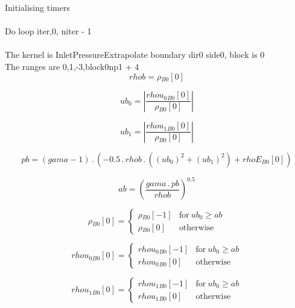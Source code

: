 \documentclass{article}
\begin{document}
\noindent Initialising timers\\
\\\noindent Do loop iter,0, niter - 1\\
\\\noindent The kernel is InletPressureExtrapolate boundary dir0 side0, block is 0\\\noindent The ranges are 0,1,-3,block0np1 + 4\\\begin{dmath}rhob = {\rho{_{B0}}}[{0}]\end{dmath}

\begin{dmath}ub_{0} = \left|{\frac{{rhou_{0}{_{B0}}}[{0}]}{{\rho{_{B0}}}[{0}]}}\right|\end{dmath}

\begin{dmath}ub_{1} = \left|{\frac{{rhou_{1}{_{B0}}}[{0}]}{{\rho{_{B0}}}[{0}]}}\right|\end{dmath}

\begin{dmath}pb = \left(gama - 1\right) \,.\, \left(- 0.5 \,.\, rhob \,.\, \left(\left(ub_{0} \right)^{2} + \left(ub_{1} \right)^{2}\right) + {rhoE{_{B0}}}[{0}]\right)\end{dmath}

\begin{dmath}ab = \left(\frac{gama \,.\, pb}{rhob} \right)^{0.5}\end{dmath}

\begin{dmath}{\rho{_{B0}}}[{0}] = \begin{cases} {\rho{_{B0}}}[{-1}] & \text{for}\: ub_{0} \geq ab \\{\rho{_{B0}}}[{0}] & \text{otherwise} \end{cases}\end{dmath}

\begin{dmath}{rhou_{0}{_{B0}}}[{0}] = \begin{cases} {rhou_{0}{_{B0}}}[{-1}] & \text{for}\: ub_{0} \geq ab \\{rhou_{0}{_{B0}}}[{0}] & \text{otherwise} \end{cases}\end{dmath}

\begin{dmath}{rhou_{1}{_{B0}}}[{0}] = \begin{cases} {rhou_{1}{_{B0}}}[{-1}] & \text{for}\: ub_{0} \geq ab \\{rhou_{1}{_{B0}}}[{0}] & \text{otherwise} \end{cases}\end{dmath}
\end{document}
